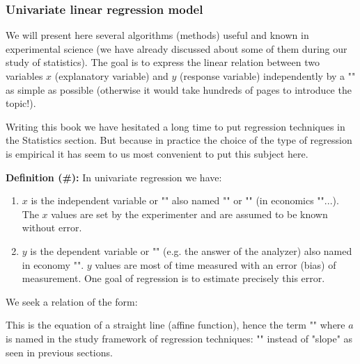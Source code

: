 	\pagebreak
	\subsubsection{Univariate linear regression model}
	
	We will present here several algorithms (methods) useful and known in experimental science (we have already discussed about some of them during our study of statistics). The goal is to express the linear relation between two variables $x$ (explanatory variable) and $y$ (response variable) independently by a "" as simple as possible (otherwise it would take hundreds of pages to introduce the topic!).
	
	\begin{tcolorbox}[title=Remark,colframe=black,arc=10pt]
	Writing this book we have hesitated a long time to put regression techniques in the Statistics section. But because in practice the choice of the type of regression is empirical it has seem to us most convenient to put this subject here.
	\end{tcolorbox}	
	
	\textbf{Definition (\#\mydef):} In univariate regression we have:
	\begin{enumerate}
		\item $x$ is the independent variable or "" also named "" or "" (in economics ""...). The $x$ values are set by the experimenter and are assumed to be known without error.
		
		\item $y$ is the dependent variable or "" (e.g. the answer of the analyzer) also named in economy "". $y$ values are most of time measured with an error (bias) of measurement. One goal of regression is to estimate precisely this error.
	\end{enumerate}
	We seek a relation of the form:
	
	This is the equation of a straight line (affine function), hence the term "" where $a$ is named in the study framework of regression techniques: "" instead of "slope" as seen in previous sections.
	
